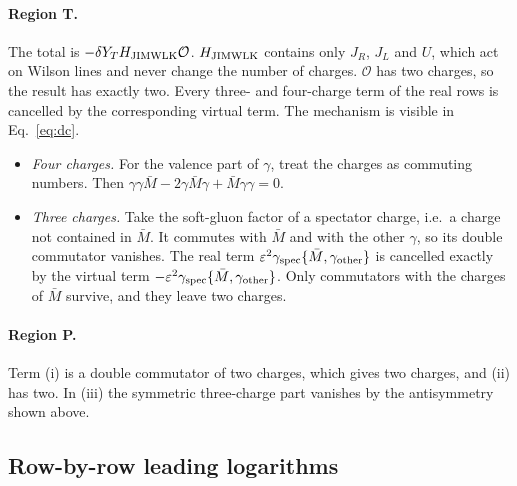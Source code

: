 \documentclass[aps,prd,onecolumn,superscriptaddress,nofootinbib,floatfix,longbibliography,11pt]{revtex4-2}
\numberwithin{equation}{section}
\newcommand{\Ord}{\mathcal{O}}
\begin{document}
\paragraph*{Region T.} The total is $-\delta Y_TH_{\rm JIMWLK}\Ord$. $H_{\rm JIMWLK}$ contains only $J_R$, $J_L$ and $U$, which act on Wilson lines and never change the number of charges. $\Ord$ has two charges, so the result has exactly two. Every three- and four-charge term of the real rows is cancelled by the corresponding virtual term. The mechanism is visible in Eq.~\eqref{eq:dc}.
\begin{itemize}
\item \emph{Four charges.} For the valence part of $\gamma$, treat the charges as commuting numbers. Then $\gamma\gamma\bar M-2\gamma\bar M\gamma+\bar M\gamma\gamma=0$.
\item \emph{Three charges.} Take the soft-gluon factor of a spectator charge, i.e.\ a charge not contained in $\bar M$. It commutes with $\bar M$ and with the other $\gamma$, so its double commutator vanishes. The real term $\varepsilon^2\gamma_{\rm spec}\{\bar M,\gamma_{\rm other}\}$ is cancelled exactly by the virtual term $-\varepsilon^2\gamma_{\rm spec}\{\bar M,\gamma_{\rm other}\}$. Only commutators with the charges of $\bar M$ survive, and they leave two charges.
\end{itemize}
\paragraph*{Region P.} Term (i) is a double commutator of two charges, which gives two charges, and (ii) has two. In (iii) the symmetric three-charge part vanishes by the antisymmetry shown above.

\subsection{Row-by-row leading logarithms}\label{sec:LLrows}
\end{document}
